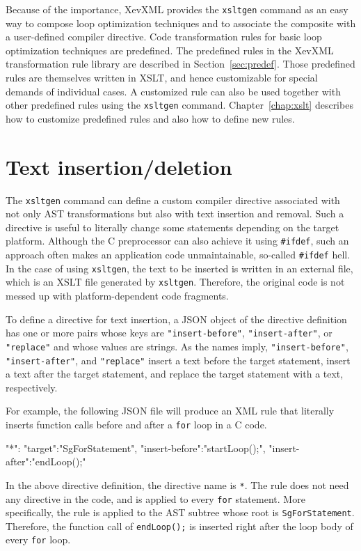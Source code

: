 Because of the importance, XevXML provides the \texttt{xsltgen} command
as an easy way to compose loop optimization techniques and to associate
the composite with a user-defined compiler directive.  Code
transformation rules for basic loop optimization techniques are
predefined. The predefined rules in the XevXML transformation rule
library are described in Section~\ref{sec:predef}.  Those predefined
rules are themselves written in XSLT, and hence customizable for special
demands of individual cases. A customized rule can also be used together
with other predefined rules using the \texttt{xsltgen}
command. Chapter~\ref{chap:xslt} describes how to customize predefined
rules and also how to define new rules.


\section{Text insertion/deletion}
The \texttt{xsltgen} command can define a custom compiler directive
associated with not only AST transformations but also with text
insertion and removal. Such a directive is useful to literally change
some statements depending on the target platform.  Although the C
preprocessor can also achieve it using \texttt{\#ifdef}, such an
approach often makes an application code unmaintainable, so-called
\texttt{\#ifdef} hell. In the case of using \texttt{xsltgen}, the text
to be inserted is written in an external file, which is an XSLT file
generated by \texttt{xsltgen}.  Therefore, the original code is not
messed up with platform-dependent code fragments.

To define a directive for text insertion, a JSON object of the directive
definition has one or more pairs whose keys are
\texttt{"insert-before"}, \texttt{"insert-after"}, or \texttt{"replace"}
and whose values are strings. As the names imply,
\texttt{"insert-before"}, \texttt{"insert-after"}, and
\texttt{"replace"} insert a text before the target statement, insert a
text after the target statement, and replace the target statement with a
text, respectively.

For example, the following JSON file will produce an XML rule that
literally inserts function calls before and after a \texttt{for} loop in
a C code.
\begin{framed}
\begin{src}
{
  "*":{
    "target":"SgForStatement",
    "insert-before":"startLoop();",
    "insert-after":"endLoop();"
  }
}
\end{src}
\end{framed}
In the above directive definition, the directive name is \texttt{*}. The
rule does not need any directive in the code, and is applied to every
\texttt{for} statement. More specifically, the rule is applied to the
AST subtree whose root is \texttt{SgForStatement}. Therefore, the
function call of \texttt{endLoop();} is inserted right after the loop
body of every \texttt{for} loop.

